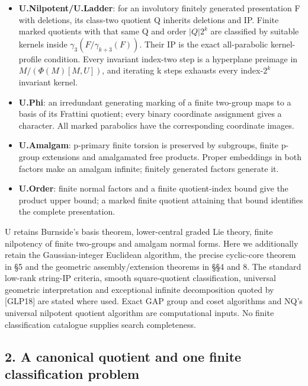 \documentclass[
  11pt,
  a4paper,
]{article}
\begin{document}
\begin{itemize}
  the constructed full type-preserving group. In the pair-support case
  local involutivity also follows from proper-singleton injectivity.
\item
  \textbf{U.Nilpotent/U.Ladder}: for an involutory finitely generated
  presentation F with deletions, its class-two quotient Q inherits
  deletions and IP. Finite marked quotients with that same Q and order
  \(|Q|2^k\) are classified by suitable kernels inside
  \(\gamma_3(F/\gamma_{k+3}(F))\). Their IP is the exact all-parabolic
  kernel-profile condition. Every invariant index-two step is a
  hyperplane preimage in \(M/(\Phi(M)[M,U])\), and iterating k steps
  exhausts every index-\(2^k\) invariant kernel.
\item
  \textbf{U.Phi}: an irredundant generating marking of a finite
  two-group maps to a basis of its Frattini quotient; every binary
  coordinate assignment gives a character. All marked parabolics have
  the corresponding coordinate images.
\item
  \textbf{U.Amalgam}: p-primary finite torsion is preserved by
  subgroups, finite p-group extensions and amalgamated free products.
  Proper embeddings in both factors make an amalgam infinite; finitely
  generated factors generate it.
\item
  \textbf{U.Order}: finite normal factors and a finite quotient-index
  bound give the product upper bound; a marked finite quotient attaining
  that bound identifies the complete presentation.
\end{itemize}

U retains Burnside's basis theorem, lower-central graded Lie theory,
finite nilpotency of finite two-groups and amalgam normal forms. Here we
additionally retain the Gaussian-integer Euclidean algorithm, the
precise cyclic-core theorem in §5 and the geometric assembly/extension
theorems in §§4 and 8. The standard low-rank string-IP criteria, smooth
square-quotient classification, universal geometric interpretation and
exceptional infinite decomposition quoted by {[}GLP18{]} are stated
where used. Exact GAP group and coset algorithms and NQ's universal
nilpotent quotient algorithm are computational inputs. No finite
classification catalogue supplies search completeness.

\subsection{2. A canonical quotient and one finite classification
problem}\label{a-canonical-quotient-and-one-finite-classification-problem}
\end{document}
